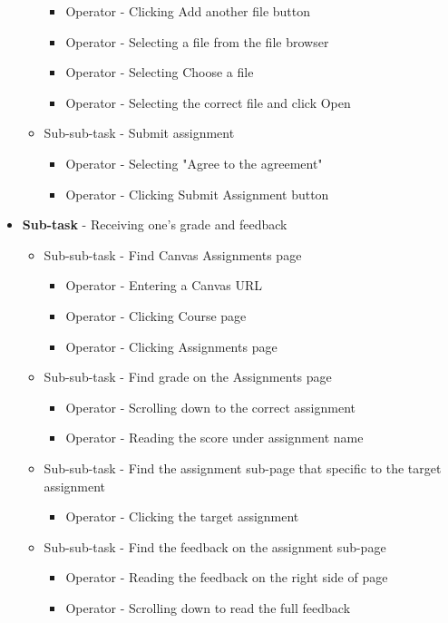\documentclass[
	letterpaper, %
]{jdf}
\begin{document}
\begin{itemize}
\begin{itemize}
                \begin{itemize}
                    \item Operator - Clicking Add another file button
                    \item Operator - Selecting a file from the file browser
                    \item Operator - Selecting Choose a file
                    \item Operator - Selecting the correct file and click Open
                \end{itemize}
            \item Sub-sub-task - Submit assignment
                \begin{itemize}
                    \item Operator - Selecting "Agree to the agreement"
                    \item Operator - Clicking Submit Assignment button
                \end{itemize}
            \end{itemize}
    \item \textbf{Sub-task} - Receiving one’s grade and feedback
        \begin{itemize}
            \item Sub-sub-task - Find Canvas Assignments page
                \begin{itemize}
                    \item Operator - Entering a Canvas URL
                    \item Operator - Clicking Course page
                    \item Operator - Clicking Assignments page 
                \end{itemize}
            \item Sub-sub-task - Find grade on the Assignments page
                \begin{itemize}
                    \item Operator - Scrolling down to the correct assignment
                    \item Operator - Reading the score under assignment name
                \end{itemize}
            \item Sub-sub-task - Find the assignment sub-page that specific to the target assignment
                \begin{itemize}
                    \item Operator - Clicking the target assignment
                \end{itemize}
            \item Sub-sub-task - Find the feedback on the assignment sub-page
                \begin{itemize}
                    \item Operator - Reading the feedback on the right side of page
                    \item Operator - Scrolling down to read the full feedback
                \end{itemize}
        \end{itemize}
\end{itemize}
\end{document}
